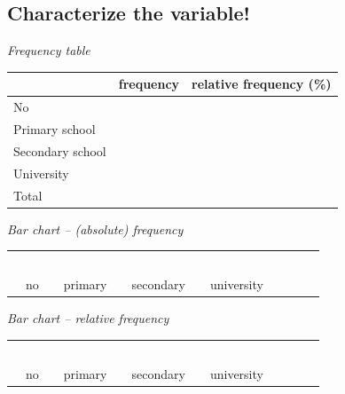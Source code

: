 	\clearpage
	\subsection{Characterize the  variable!}

	\emph{Frequency table}
	
	\begin{center}
		\begin{tabular}{l|l|l}
		\toprule
				& frequency	& relative frequency (\%)\\
		\midrule		
		No&&\\
		Primary school&&\\
		Secondary school &&\\
	   University&&\\
		\midrule
		Total&&\\
		\bottomrule
		\end{tabular}
	\end{center}

	\noindent\emph{Bar chart -- (absolute) frequency}\smallskip
		
	\begin{center}
		\begin{tabular}{|llllllllllll}
		&&\\\\\\\\\\
		\hline
		\multicolumn{1}{l}{}& no && primary && secondary && university
		\end{tabular}
	\end{center}
	
		\noindent\emph{Bar chart -- relative frequency}\smallskip
			
		\begin{center}
			\begin{tabular}{|llllllllllll}
			&&\\\\\\\\\\
			\hline
			\multicolumn{1}{l}{}& no && primary && secondary && university
			\end{tabular}
		\end{center}
		
	


